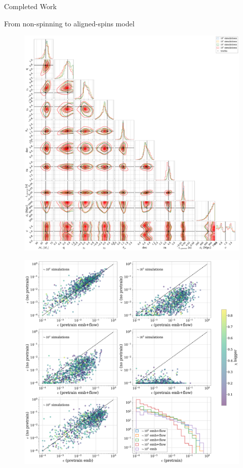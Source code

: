 \documentclass[a4paper, 12pt, twoside, openright, titlepage]{book}
\begin{document}
\begin{chapter}{Completed Work}
\begin{section}{From non-spinning to aligned-spins model}
\begin{figure}
\includegraphics[width=1.2\columnwidth]{figures/cornerplots.pdf}
\caption{}
\label{cp}
\end{figure}

\begin{figure}
\includegraphics[width=1.1\columnwidth]{figures/neff.pdf}
\caption{}
\label{eff}
\end{figure}







\end{section}



\end{chapter}
\end{document}
